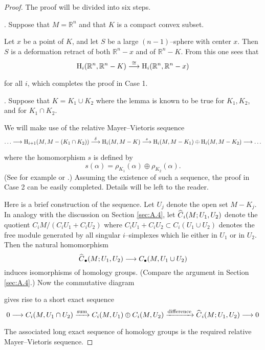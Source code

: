 \documentclass[../main]{subfiles}
\begin{document}
\begin{proof}
The proof will be divided into six steps.

. Suppose that $M = {\mathbb R}^n$ and that $K$ is a compact convex subset.

Let $x$ be a point of $K$, and let $S$ be a large $(n - 1)$--sphere with center $x$. Then $S$ is a deformation retract of both ${\mathbb R}^n - x$ and of ${\mathbb R}^n - K$. From this one sees that \[\homology_i({\mathbb R}^n, {\mathbb R}^n - K) \varrightarrow{\cong} \homology_i({\mathbb R}^n, {\mathbb R}^n - x)\] for all $i$, which completes the proof in Case 1. 

. Suppose that $K = K_1 \cup K_2$ where the lemma is known to be true for $K_1, K_2$, and for $K_1 \cap K_2$.

We will make use of the relative Mayer--Vietoris sequence \[\ldots \varrightarrow{} \homology_{i + 1}(M, M - (K_1 \cap K_2)) \varrightarrow{\delta} \homology_i(M, M - K) \varrightarrow{s} \homology_i(M, M - K_1) \oplus \homology_i(M, M - K_2) \varrightarrow{} \ldots\] where the homomorphism $s$ is defined by \[s(\alpha) = \rho_{K_1}(\alpha) \oplus \rho_{K_2}(\alpha).\] (See for example \cite[p. 42]{eilenbergsteenrod1952} or \cite[p. 187]{spanier1981}.) Assuming the existence of such a sequence, the proof in Case 2 can be easily completed. Details will be left to the reader.

Here is a brief construction of the sequence. Let $U_j$ denote the open set $M - K_j$. In analogy with the discussion on Section \ref{sec:A.4}, let ${\xhat C}_i(M; U_1, U_2)$ denote the quotient $C_i M/(C_i U_1 + C_i U_2)$ where $C_i U_1 + C_i U_2 \subset C_i(U_1 \cup U_2)$ denotes the free module generated by all singular $i$--simplexes which lie either in $U_1$ or in $U_2$. Then the natural homomorphism \[{\xhat C}_\bullet(M; U_1, U_2) \longrightarrow C_\bullet(M, U_1 \cup U_2)\] induces isomorphisms of homology groups. (Compare the argument in Section \ref{sec:A.4}.) Now the commutative diagram

\begin{center}
\end{center}
gives rise to a short exact sequence \[0 \varrightarrow{} C_i(M, U_1 \cap U_2) \varrightarrow{\text{sum}} C_i(M, U_1) \oplus C_i(M, U_2) \varrightarrow{\text{difference}} {\xhat C}_i (M; U_1, U_2) \varrightarrow{} 0\] The associated long exact sequence of homology groups is the required relative Mayer--Vietoris sequence. 


\end{proof}
\end{document}
